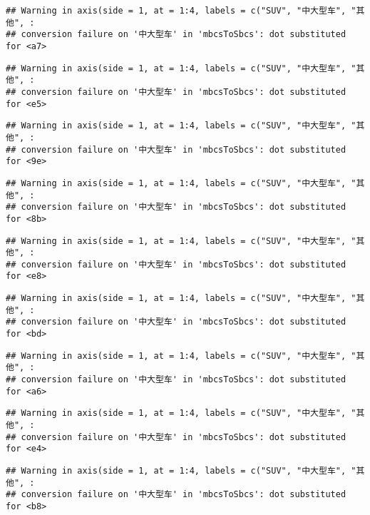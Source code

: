 \documentclass[]{article}
\begin{document}
\begin{verbatim}
## Warning in axis(side = 1, at = 1:4, labels = c("SUV", "中大型车", "其他", :
## conversion failure on '中大型车' in 'mbcsToSbcs': dot substituted for <a7>
\end{verbatim}

\begin{verbatim}
## Warning in axis(side = 1, at = 1:4, labels = c("SUV", "中大型车", "其他", :
## conversion failure on '中大型车' in 'mbcsToSbcs': dot substituted for <e5>
\end{verbatim}

\begin{verbatim}
## Warning in axis(side = 1, at = 1:4, labels = c("SUV", "中大型车", "其他", :
## conversion failure on '中大型车' in 'mbcsToSbcs': dot substituted for <9e>
\end{verbatim}

\begin{verbatim}
## Warning in axis(side = 1, at = 1:4, labels = c("SUV", "中大型车", "其他", :
## conversion failure on '中大型车' in 'mbcsToSbcs': dot substituted for <8b>
\end{verbatim}

\begin{verbatim}
## Warning in axis(side = 1, at = 1:4, labels = c("SUV", "中大型车", "其他", :
## conversion failure on '中大型车' in 'mbcsToSbcs': dot substituted for <e8>
\end{verbatim}

\begin{verbatim}
## Warning in axis(side = 1, at = 1:4, labels = c("SUV", "中大型车", "其他", :
## conversion failure on '中大型车' in 'mbcsToSbcs': dot substituted for <bd>
\end{verbatim}

\begin{verbatim}
## Warning in axis(side = 1, at = 1:4, labels = c("SUV", "中大型车", "其他", :
## conversion failure on '中大型车' in 'mbcsToSbcs': dot substituted for <a6>
\end{verbatim}

\begin{verbatim}
## Warning in axis(side = 1, at = 1:4, labels = c("SUV", "中大型车", "其他", :
## conversion failure on '中大型车' in 'mbcsToSbcs': dot substituted for <e4>
\end{verbatim}

\begin{verbatim}
## Warning in axis(side = 1, at = 1:4, labels = c("SUV", "中大型车", "其他", :
## conversion failure on '中大型车' in 'mbcsToSbcs': dot substituted for <b8>
\end{verbatim}
\end{document}
